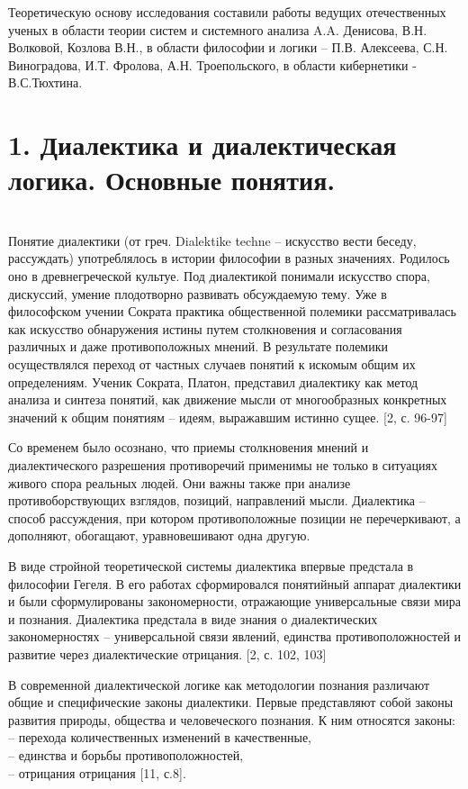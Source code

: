 \documentclass[a4paper,12pt]{report}
\begin{document}
	Теоретическую основу исследования составили работы ведущих отечественных ученых в области теории систем и системного анализа A.A. Денисова, В.Н. Волковой, Козлова В.Н., в области философии и логики  – П.В. Алексеева, С.Н. Виноградова, И.Т. Фролова, А.Н. Троепольского, в области кибернетики -  В.С.Тюхтина.\\



\chapter*{1.  Диалектика и диалектическая логика. Основные понятия. }
 \\

Понятие диалектики (от греч. Dialektike techne – искусство вести беседу, рассуждать) употреблялось в истории философии в разных значениях. Родилось оно в древнегреческой культуе. Под диалектикой понимали искусство спора, дискуссий, умение плодотворно развивать обсуждаемую тему. Уже в философском учении Сократа практика общественной полемики рассматривалась как искусство обнаружения истины путем столкновения и согласования различных и даже противоположных мнений. В результате полемики осуществлялся переход от частных случаев понятий к искомым общим их определениям. Ученик Сократа, Платон, представил диалектику как метод анализа и синтеза понятий, как движение мысли от многообразных конкретных значений к общим понятиям – идеям, выражавшим истинно сущее. [2, с. 96-97] 

	Со временем было осознано, что приемы столкновения мнений и диалектического разрешения противоречий применимы не только в ситуациях живого спора реальных людей. Они важны также при анализе противоборствующих взглядов, позиций, направлений мысли. Диалектика – способ рассуждения, при котором противоположные позиции не перечеркивают, а дополняют, обогащают, уравновешивают одна другую. 

	В виде стройной теоретической системы диалектика впервые предстала в философии Гегеля. В его работах сформировался понятийный аппарат диалектики и были сформулированы закономерности, отражающие универсальные связи мира и познания. Диалектика предстала в виде знания о диалектических закономерностях – универсальной связи явлений, единства противоположностей и развитие через диалектические отрицания. [2, с. 102, 103]

	В современной диалектической логике как методологии познания различают общие и специфические законы диалектики. Первые представляют собой законы развития природы, общества и человеческого познания. К ним относятся законы:\\
	– перехода количественных изменений в качественные, \\
	– единства и борьбы противоположностей,\\
	– отрицания отрицания [11, с.8].
	
\end{document}
